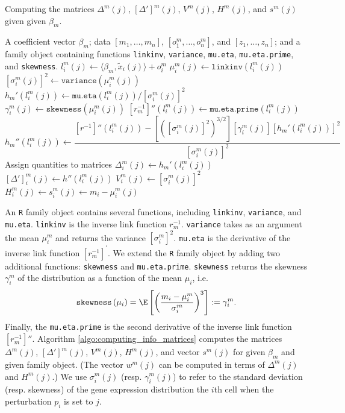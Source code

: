 \documentclass[11pt]{article}
\begin{document}
\begin{appendices}
\begin{refsection}
\begin{algorithm}
	\caption{Computing the matrices $\Delta^m(j)$, $[\Delta']^m(j)$, $V^m(j)$, $H^m(j)$, and $s^m(j)$ given given $\beta_m$.}\label{algo:computing_info_matrices}
	\begin{algorithmic}[3]
		\Require A coefficient vector $\beta_m$; data $[m_1, \dots, m_n]$, $[o^m_1, \dots, o^m_n]$, and $[z_1, \dots, z_n]$; and a family object containing functions \texttt{linkinv}, \texttt{variance}, \texttt{mu.eta}, \texttt{mu.eta.prime}, and \texttt{skewness}.
		\State $l^m_i(j) \gets \langle \beta_m, \tilde{x}_i(j) \rangle + o^m_i$
		\State $\mu^m_i(j) \gets \texttt{linkinv}(l^m_i(j))$
		\State $[\sigma_i^m(j)]^2 \gets \texttt{variance}(\mu_i^m(j))$
		\State $h_m'(l_i^m(j)) \gets \texttt{mu.eta}(l_i^m(j))/[\sigma_i^m(j)]^2$
		\State $\gamma^m_i(j) \gets \texttt{skewness}(\mu^m_i(j))$
		\State $[r_m^{-1}]''(l_i^m(j)) \gets \texttt{mu.eta.prime}(l^m_i(j))$
		\State $$h_m''(l_i^m(j)) \gets \frac{[r^{-1}]''(l_i^m(j)) - [([\sigma_i^m(j)]^2)^{3/2}][\gamma^m_i(j)] [h_m'(l_i^m(j))]^2}{[\sigma_i^m(j)]^2}$$
		\Comment Assign quantities to matrices
		\State $\Delta_{i}^m(j) \gets h_m'( l_i^m(j))$
		\State $[\Delta']^m_{i}(j) \gets h''(l^m_i(j))$
		\State $V^m_{i}(j) \gets [\sigma^m_i(j)]^2$
		\State $H^m_{i}(j) \gets s^m_i(j) \gets m_i - \mu^m_i(j)$
		\EndFor
		\EndFor
	\end{algorithmic}
\end{algorithm}

An \texttt{R} family object contains several functions, including \texttt{linkinv}, \texttt{variance}, and \texttt{mu.eta}. \texttt{linkinv} is the inverse link function $r_m^{-1}$. \texttt{variance} takes as an argument the mean $\mu^m_i$ and returns the variance $[\sigma_i^m]^2$. \texttt{mu.eta} is the derivative of the inverse link function $[r^{-1}_m]^{'}$. We extend the \texttt{R} family object by adding two additional functions: \texttt{skewness} and \texttt{mu.eta.prime}. \texttt{skewness} returns the skewness $\gamma^m_i$ of the distribution as a function of the mean $\mu_i$, i.e. $$\texttt{skewness}\left(\mu_i\right) = \E \left[\left(\frac{m_i - \mu_i^m}{ \sigma_i^m}\right)^3\right] := \gamma_i^m.$$ Finally, the \texttt{mu.eta.prime} is the second derivative of the inverse link function $[r^{-1}_m]''.$ Algorithm \ref{algo:computing_info_matrices} computes the matrices $\Delta^m(j)$, $[\Delta']^m(j)$, $V^m(j)$, $H^m(j)$, and vector $s^m(j)$ for given $\beta_m$ and given family object. (The vector $w^m(j)$ can be computed in terms of $\Delta^m(j)$ and $H^m(j)$.) We use $\sigma^m_i(j)$ (resp. $\gamma^m_i(j)$) to refer to the standard deviation (resp. skewness) of the gene expression distribution the $i$th cell when the perturbation $p_i$ is set to $j$.


\end{refsection}
\end{appendices}
\end{document}
